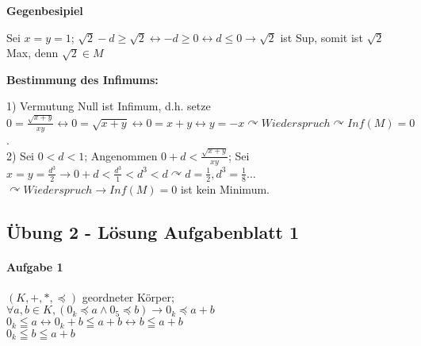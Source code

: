 \documentclass[10pt,a4paper,draft]{scrartcl}
\begin{document}
\textbf{Gegenbesipiel}
\begin{tabbing}
	Sei $x = y = 1$; $\sqrt{2} - d\geq \sqrt{2} \leftrightarrow -d\geq 0 \leftrightarrow d\leq 0\rightarrow\sqrt{2}$ ist Sup, somit ist $\sqrt{2}$ Max, denn $\sqrt{2}\in M$
\end{tabbing}

\textbf{Bestimmung des Infimums:}
\begin{tabbing}
1) Vermutung Null ist Infimum, d.h. setze $0 = \frac{\sqrt{x + y}}{xy}\leftrightarrow 0 =\sqrt{x + y}\leftrightarrow 0 = x + y\leftrightarrow y = -x\curvearrowright Wiederspruch\curvearrowright Inf(M) = 0$.\\
2) Sei $0 < d < 1$; Angenommen $0 + d < \frac{\sqrt{x + y}}{xy}$; Sei $x=y=\frac{d^{3}}{2}\rightarrow 0+d<\frac{d^{3}}{1}<d^{3}<d\curvearrowright d=\frac{1}{2}, d^{3}=\frac{1}{8}\ldots$\\
		$\curvearrowright Wiederspruch\rightarrow Inf(M)=0$ ist kein Minimum.
\end{tabbing}

\subsection*{Übung 2 - Lösung Aufgabenblatt 1}
\paragraph*{Aufgabe 1}
\begin{tabbing}
$(K,+,*,\preceq)$ geordneter Körper;\\
$\forall a,b\in K, (0_{k}\preceq a\wedge 0_{5}\preceq b)\rightarrow 0_{k}\preceq a + b$\\
$0_{k}\leqq a\leftrightarrow 0_{k} + b\leqq a+ b\leftrightarrow b\leqq a + b$\\
$0_{k}\leqq b\leqq a + b$\\
\end{tabbing}
\end{document}
